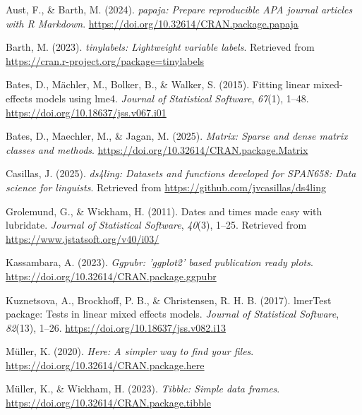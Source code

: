 \documentclass[
  ,man,floatsintext]{apa6}
\newlength{\cslhangindent}
\newenvironment{CSLReferences}[2] %
 {\begin{list}{}{%
  \setlength{\itemindent}{0pt}
  \setlength{\leftmargin}{0pt}
  \setlength{\parsep}{0pt}
  \ifodd #1
   \setlength{\leftmargin}{\cslhangindent}
   \setlength{\itemindent}{-1\cslhangindent}
  \fi
  \setlength{\itemsep}{#2\baselineskip}}}
 {\end{list}}
\begin{document}
\setlength{\parindent}{-0.5in}
\setlength{\leftskip}{0.5in}

\label{refs}
\begin{CSLReferences}{1}{0}
Aust, F., \& Barth, M. (2024). \emph{{papaja}: {Prepare} reproducible {APA} journal articles with {R Markdown}}. \url{https://doi.org/10.32614/CRAN.package.papaja}

Barth, M. (2023). \emph{{tinylabels}: Lightweight variable labels}. Retrieved from \url{https://cran.r-project.org/package=tinylabels}

Bates, D., Mächler, M., Bolker, B., \& Walker, S. (2015). Fitting linear mixed-effects models using {lme4}. \emph{Journal of Statistical Software}, \emph{67}(1), 1--48. \url{https://doi.org/10.18637/jss.v067.i01}

Bates, D., Maechler, M., \& Jagan, M. (2025). \emph{Matrix: Sparse and dense matrix classes and methods}. \url{https://doi.org/10.32614/CRAN.package.Matrix}

Casillas, J. (2025). \emph{ds4ling: Datasets and functions developed for SPAN658: Data science for linguists}. Retrieved from \url{https://github.com/jvcasillas/ds4ling}

Grolemund, G., \& Wickham, H. (2011). Dates and times made easy with {lubridate}. \emph{Journal of Statistical Software}, \emph{40}(3), 1--25. Retrieved from \url{https://www.jstatsoft.org/v40/i03/}

Kassambara, A. (2023). \emph{Ggpubr: 'ggplot2' based publication ready plots}. \url{https://doi.org/10.32614/CRAN.package.ggpubr}

Kuznetsova, A., Brockhoff, P. B., \& Christensen, R. H. B. (2017). {lmerTest} package: Tests in linear mixed effects models. \emph{Journal of Statistical Software}, \emph{82}(13), 1--26. \url{https://doi.org/10.18637/jss.v082.i13}

Müller, K. (2020). \emph{Here: A simpler way to find your files}. \url{https://doi.org/10.32614/CRAN.package.here}

Müller, K., \& Wickham, H. (2023). \emph{Tibble: Simple data frames}. \url{https://doi.org/10.32614/CRAN.package.tibble}


\end{CSLReferences}
\end{document}
